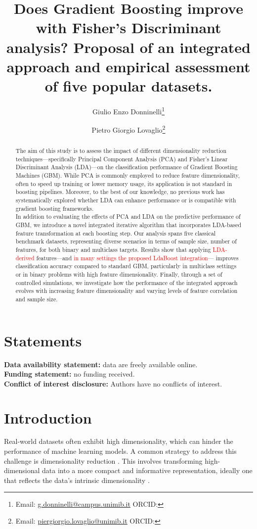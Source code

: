 \documentclass[11pt,a4paper]{article}
\title{Does Gradient Boosting improve with Fisher’s Discriminant analysis? Proposal of an integrated approach and empirical assessment of five popular datasets.}
\author[1]{Giulio Enzo Donninelli\thanks{Email: \href{mailto:g.donninelli@campus.unimib.it}{g.donninelli@campus.unimib.it} \quad ORCID: \orcidlink{0009-0009-7332-1159}}}
\author[1,2]{Pietro Giorgio Lovaglio\thanks{Email: \href{mailto:piergiorgio.lovaglio@unimib.it}{piergiorgio.lovaglio@unimib.it} \quad ORCID: \orcidlink{0000-0002-2340-0547}}}
\affil[1]{Dept of Statistics and Quantitative Methods, University of Milano-Bicocca, Milan, Italy}
\affil[2]{CRISP Research Center, University of Milano-Bicocca, Milan, Italy}
\date{} %
\providecommand{\DIFaddtex}[1]{\textcolor{red}{#1}} %
\providecommand{\DIFaddbegin}{} %
\providecommand{\DIFaddend}{} %
\providecommand{\DIFadd}[1]{\texorpdfstring{\DIFaddtex{#1}}{#1}} %
\begin{document}
\maketitle

\begin{abstract}
The aim of this study is to assess the impact of different dimensionality reduction techniques—specifically Principal Component Analysis (PCA) and Fisher's Linear Discriminant Analysis (LDA)—on the classification performance of Gradient Boosting Machines (GBM). While PCA is commonly employed to reduce feature dimensionality, often to speed up training or lower memory usage, its application is not standard in boosting pipelines. Moreover, to the best of our knowledge, no previous work has systematically explored whether LDA can enhance performance or is compatible with gradient boosting frameworks.\\[2ex]

In addition to evaluating the effects of PCA and LDA on the predictive performance of GBM, we introduce a novel integrated iterative algorithm that incorporates LDA-based feature transformation at each boosting step. Our analysis spans five classical benchmark datasets, representing diverse scenarios in terms of sample size, number of features, for both binary and multiclass targets. Results show that applying  \DIFaddbegin \DIFadd{LDA-derived }\DIFaddend features—and  \DIFaddbegin \DIFadd{in many settings the proposed LdaBoost integration}\DIFaddend — improves classification accuracy compared to standard GBM, particularly in multiclass settings or in binary problems with high feature dimensionality. Finally, through a set of controlled simulations, we investigate how the performance of the integrated approach evolves with increasing feature dimensionality and varying levels of feature correlation and sample size.

\end{abstract}

\section*{Statements}
\noindent\textbf{Data availability statement:} data are freely available online.\\
\textbf{Funding statement:} no funding received.\\
\textbf{Conflict of interest disclosure:} Authors have no conflicts of interest.

\newpage
\section{Introduction}
Real-world datasets often exhibit high dimensionality, which can hinder the performance of machine learning models. A common strategy to address this challenge is dimensionality reduction \citep{van2009dimensionality}. This involves transforming high-dimensional data into a more compact and informative representation, ideally one that reflects the data's intrinsic dimensionality \citep{huang2019review, bacanin2021dimensionality}.
\end{document}
